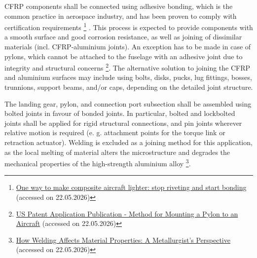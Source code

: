 

CFRP components shall be connected using adhesive bonding, which is the common practice in aerospace industry, and has been proven to comply with certification requirements \footnote{\href{https://www.tudelft.nl/en/ae/current/research-stories/one-way-to-make-composite-aircraft-lighter-stop-riveting-and-start-bonding}{ One way to make composite aircraft lighter: stop riveting and start bonding} (accessed on 22.05.2026)}
\cite{CFRPbonding}. This process is expected to provide components with a smooth surface and good corrosion resistance, as well as joining of dissimilar materials (incl. CFRP-aluminium joints). An exception has to be made in case of pylons, which cannot be attached to the fuselage with an adhesive joint due to integrity and structural concerns \footnote{\href{https://patentimages.storage.googleapis.com/b6/9d/6c/42339e49b46460/US20150013142A1.pdf}{US Patent Application Publication - Method for Mounting a Pylon to an Aircraft} (accessed on 22.05.2026)}. The alternative solution to joining the CFRP and aluminium surfaces may include using bolts, disks, pucks, lug fittings,
bosses, trunnions, support beams, and/or caps, depending on the detailed joint structure.

The landing gear, pylon, and connection port subsection shall be assembled using bolted joints in favour of bonded joints. In particular, bolted and lockbolted joints shall be applied for rigid structural connections, and pin joints wherever relative motion is required (e. g. attachment points for the torque link or retraction actuator). Welding is excluded as a joining method for this application, as the local melting of material alters the microstructure and degrades the mechanical properties of the high-strength aluminium alloy \footnote{\href{https://www.stillarcsiteservices.co.uk/blog/how-welding-affects-material-properties-a-metallurgists-perspective}{How Welding Affects Material Properties: A Metallurgist’s Perspective} (accessed on 22.05.2026)}.

